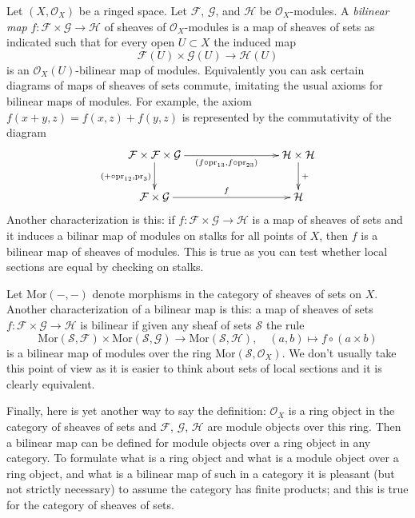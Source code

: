 \noindent
Let $(X, \mathcal{O}_X)$ be a ringed space.
Let $\mathcal{F}$, $\mathcal{G}$, and $\mathcal{H}$ be $\mathcal{O}_X$-modules.
A {\it bilinear map} $f : \mathcal{F} \times \mathcal{G} \to \mathcal{H}$
of sheaves of $\mathcal{O}_X$-modules is a map of sheaves of sets as indicated
such that for every open $U \subset X$ the induced map
$$
\mathcal{F}(U) \times \mathcal{G}(U) \to \mathcal{H}(U)
$$
is an $\mathcal{O}_X(U)$-bilinear map of modules. Equivalently you can ask
certain diagrams of maps of sheaves of sets commute, imitating the usual
axioms for bilinear maps of modules. For example, the axiom
$f(x + y, z) = f(x, z) + f(y, z)$ is represented by the commutativity
of the diagram
$$
\xymatrix{
\mathcal{F} \times \mathcal{F} \times \mathcal{G}
\ar[rrr]_{(f \circ \text{pr}_{13}, f \circ \text{pr}_{23})}
\ar[d]_{(+ \circ \text{pr}_{12}, \text{pr}_3)} & & &
\mathcal{H} \times \mathcal{H}
\ar[d]^{+} \\
\mathcal{F} \times \mathcal{G} \ar[rrr]^f & & &
\mathcal{H}
}
$$
Another characterization is this: if
$f : \mathcal{F} \times \mathcal{G} \to \mathcal{H}$
is a map of sheaves of sets and
it induces a bilinar map of modules on stalks for all points of $X$, then
$f$ is a bilinear map of sheaves of modules. This is true as you can test
whether local sections are equal by checking on stalks.

\medskip\noindent
Let $\text{Mor}( - , - )$ denote morphisms in the category of sheaves of
sets on $X$. Another characterization of a bilinear map is this:
a map of sheaves of sets
$f : \mathcal{F} \times \mathcal{G} \to \mathcal{H}$
is bilinear if given any sheaf of sets $\mathcal{S}$ the rule
$$
\text{Mor}(\mathcal{S}, \mathcal{F}) \times
\text{Mor}(\mathcal{S}, \mathcal{G}) \to
\text{Mor}(\mathcal{S}, \mathcal{H}),\quad
(a, b) \mapsto f \circ (a \times b)
$$
is a bilinear map of modules over the ring
$\text{Mor}(\mathcal{S}, \mathcal{O}_X)$.
We don't usually take this point of view as it is easier to think about
sets of local sections and it is clearly equivalent.

\medskip\noindent
Finally, here is yet another way to say the definition:
$\mathcal{O}_X$ is a ring object in the category of sheaves of sets
and $\mathcal{F}$, $\mathcal{G}$, $\mathcal{H}$ are module objects
over this ring. Then a bilinear map can be defined for module objects
over a ring object in any category.
To formulate what is a ring object and what is a module object
over a ring object, and what is a bilinear map of such in a
category it is pleasant (but not strictly necessary)
to assume the category has finite products; and
this is true for the category of sheaves of sets.







